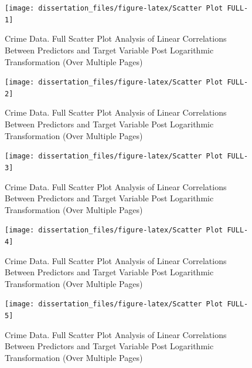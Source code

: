 \documentclass[
  11pt,
]{article}
\begin{document}
\begin{figure}[H]

{\centering \texttt{[image: dissertation\_files/figure-latex/Scatter Plot FULL-1]} 

}

\caption{Crime Data. Full Scatter Plot Analysis of Linear Correlations Between Predictors and Target Variable Post Logarithmic Transformation (Over Multiple Pages)}\label{fig:Scatter Plot FULL-1}
\end{figure}
\begin{figure}[H]

{\centering \texttt{[image: dissertation\_files/figure-latex/Scatter Plot FULL-2]} 

}

\caption{Crime Data. Full Scatter Plot Analysis of Linear Correlations Between Predictors and Target Variable Post Logarithmic Transformation (Over Multiple Pages)}\label{fig:Scatter Plot FULL-2}
\end{figure}
\begin{figure}[H]

{\centering \texttt{[image: dissertation\_files/figure-latex/Scatter Plot FULL-3]} 

}

\caption{Crime Data. Full Scatter Plot Analysis of Linear Correlations Between Predictors and Target Variable Post Logarithmic Transformation (Over Multiple Pages)}\label{fig:Scatter Plot FULL-3}
\end{figure}
\begin{figure}[H]

{\centering \texttt{[image: dissertation\_files/figure-latex/Scatter Plot FULL-4]} 

}

\caption{Crime Data. Full Scatter Plot Analysis of Linear Correlations Between Predictors and Target Variable Post Logarithmic Transformation (Over Multiple Pages)}\label{fig:Scatter Plot FULL-4}
\end{figure}
\begin{figure}[H]

{\centering \texttt{[image: dissertation\_files/figure-latex/Scatter Plot FULL-5]} 

}

\caption{Crime Data. Full Scatter Plot Analysis of Linear Correlations Between Predictors and Target Variable Post Logarithmic Transformation (Over Multiple Pages)}\label{fig:Scatter Plot FULL-5}
\end{figure}
\end{document}
